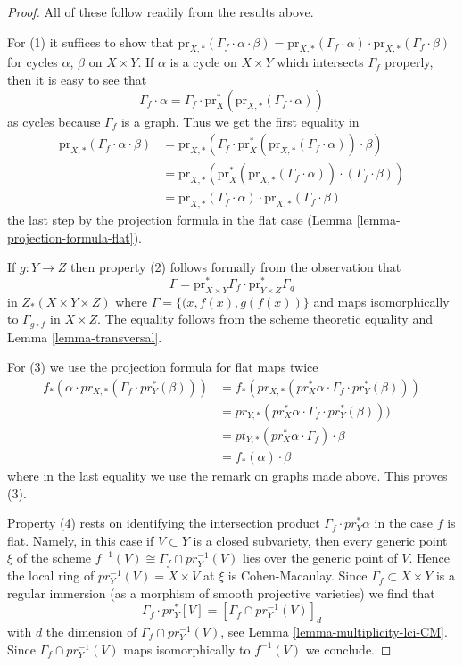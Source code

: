 \begin{proof}
All of these follow readily from the results above.

\medskip\noindent
For (1) it suffices to show that
$\text{pr}_{X,*}( \Gamma_f \cdot \alpha \cdot \beta) =
\text{pr}_{X,*}(\Gamma_f \cdot \alpha) \cdot
\text{pr}_{X,*}(\Gamma_f \cdot \beta)$
for cycles $\alpha$, $\beta$ on $X \times Y$. If $\alpha$ is a cycle on
$X \times Y$ which intersects $\Gamma_f$ properly, then it is easy
to see that
$$
\Gamma_f \cdot \alpha =
\Gamma_f \cdot \text{pr}_X^*(\text{pr}_{X,*}(\Gamma_f \cdot \alpha))
$$
as cycles because $\Gamma_f$ is a graph. Thus we get the first
equality in
\begin{align*}
\text{pr}_{X,*}(\Gamma_f \cdot \alpha \cdot \beta)
& =
\text{pr}_{X,*}(
\Gamma_f \cdot
\text{pr}_X^*(\text{pr}_{X,*}(\Gamma_f \cdot \alpha)) \cdot \beta) \\
& =
\text{pr}_{X,*}(\text{pr}_X^*(\text{pr}_{X,*}(\Gamma_f \cdot \alpha))
\cdot (\Gamma_f \cdot \beta)) \\
& =
\text{pr}_{X,*}(\Gamma_f \cdot \alpha) \cdot
\text{pr}_{X,*}(\Gamma_f \cdot \beta)
\end{align*}
the last step by the projection formula in the flat case
(Lemma \ref{lemma-projection-formula-flat}).

\medskip\noindent
If $g : Y \to Z$ then property (2) follows formally from the observation that
$$
\Gamma =
\text{pr}_{X \times Y}^*\Gamma_f \cdot
\text{pr}_{Y \times Z}^*\Gamma_g
$$
in $Z_*(X \times Y \times Z)$ where $\Gamma = \{(x, f(x), g(f(x))\}$
and maps isomorphically to $\Gamma_{g \circ f}$ in $X \times Z$.
The equality follows from the scheme theoretic equality and
Lemma \ref{lemma-transversal}.

\medskip\noindent
For (3) we use the projection formula for flat maps twice
\begin{align*}
f_*(\alpha \cdot pr_{X, *}(\Gamma_f \cdot pr_Y^*(\beta)))
& =
f_*(pr_{X, *}(pr_X^*\alpha \cdot \Gamma_f \cdot pr_Y^*(\beta))) \\
& =
pr_{Y, *}(pr_X^*\alpha \cdot \Gamma_f \cdot pr_Y^*(\beta))) \\
& =
pt_{Y, *}(pr_X^*\alpha \cdot \Gamma_f) \cdot \beta \\
& =
f_*(\alpha) \cdot \beta
\end{align*}
where in the last equality we use the remark on graphs made above.
This proves (3).

\medskip\noindent
Property (4) rests on identifying the intersection product
$\Gamma_f \cdot pr_Y^*\alpha$ in the case $f$ is flat. Namely, in this
case if $V \subset Y$ is a closed subvariety, then every generic point
$\xi$ of the scheme $f^{-1}(V) \cong \Gamma_f \cap pr_Y^{-1}(V)$
lies over the generic point of $V$. Hence the local ring of
$pr_Y^{-1}(V) = X \times V$ at $\xi$ is Cohen-Macaulay. Since
$\Gamma_f \subset X \times Y$ is a regular immersion (as a morphism of
smooth projective varieties) we find that
$$
\Gamma_f \cdot pr_Y^*[V] = [\Gamma_f \cap pr_Y^{-1}(V)]_d
$$
with $d$ the dimension of $\Gamma_f \cap pr_Y^{-1}(V)$, see
Lemma \ref{lemma-multiplicity-lci-CM}. Since $\Gamma_f \cap pr_Y^{-1}(V)$
maps isomorphically to $f^{-1}(V)$ we conclude.
\end{proof}


